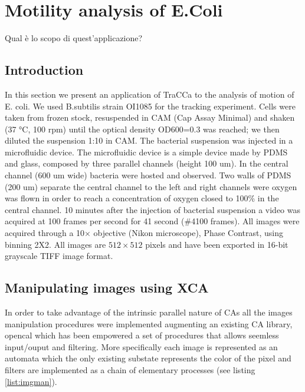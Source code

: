 \documentclass[conference]{IEEEtran}
\begin{document}
\section{Motility analysis of E.Coli}
Qual è lo scopo di quest'applicazione?
\subsection{Introduction}



In this section we present an application of TraCCa to the analysis of motion of E. coli.
We used B.subtilis strain OI1085 for the tracking experiment. Cells were taken from frozen stock, resuspended in CAM (Cap Assay Minimal) and shaken  (37 °C, 100 rpm) until the optical density OD600=0.3 was reached; we then diluted the suspension 1:10 in CAM. The bacterial suspension was injected in a microfluidic device. The microfluidic device is a simple device made by PDMS and glass, composed by three parallel channels (height 100 um). In the central channel (600 um wide) bacteria were hosted and observed. Two  walls of PDMS (200 um) separate the central channel to the left and right channels were oxygen was flown in order to reach a concentration of oxygen closed to 100\% in the central channel. 10 minutes after the injection of bacterial suspension a video was acquired at 100 frames per second for 41 second (\#4100 frames). All images were acquired through a 10$\times$ objective (Nikon microscope), Phase Contrast, using binning 2X2.
All images are $512 \times 512$ pixels and have been exported in 16-bit grayscale TIFF image format.

\subsection{Manipulating images using XCA}
	In order to take advantage of the intrinsic parallel nature of CAs all the images manipulation procedures were implemented augmenting an existing CA library, opencal\cite{dambrosio:2016} which has been empowered  a set of procedures that allows seemless input/ouput and filtering.
	More specifically each image is represented as an automata which the only existing substate represents the color of the pixel and filters are implemented as a chain of elementary processes (see listing \ref{list:imgman}).
\end{document}
